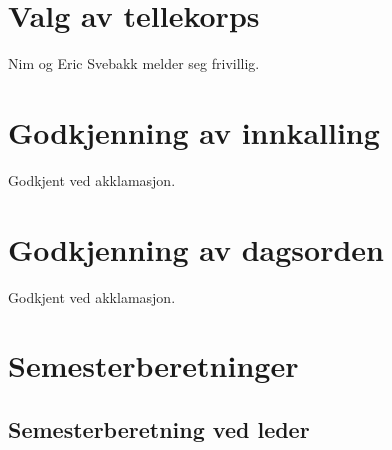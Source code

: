 \documentclass[10pt,norsk,a4paper,usenames,dvipsnames]{article}
\begin{document}
\section{Valg av tellekorps}
Nim og Eric Svebakk melder seg frivillig.

\section{Godkjenning av innkalling}
Godkjent ved akklamasjon.

\section{Godkjenning av dagsorden}
Godkjent ved akklamasjon.


\section{Semesterberetninger}
    \subsection{Semesterberetning ved leder}
\end{document}
